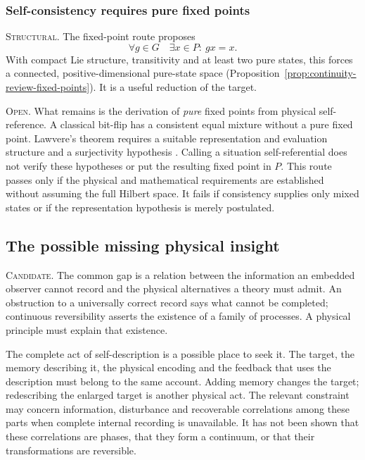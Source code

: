 \subsubsection{Self-consistency requires pure fixed points}
\label{app:continuity-fixed-points}

\noindent\textsc{Structural.}
The fixed-point route proposes
\begin{equation}
  \forall g\in G\quad\exists x\in P:\ gx=x.
  \label{eq:continuity-pure-fixed-point}
\end{equation}
With compact Lie structure, transitivity and at least two pure states,
this forces a connected, positive-dimensional pure-state space
(Proposition~\ref{prop:continuity-review-fixed-points}). It is a useful
reduction of the target.

\noindent\textsc{Open.}
What remains is the derivation of \emph{pure} fixed points from physical
self-reference. A classical bit-flip has a consistent equal mixture without
a pure fixed point. Lawvere's theorem requires a suitable representation
and evaluation structure and a surjectivity hypothesis
\autocite{Lawvere_1969,Yanofsky2003}. Calling a situation self-referential
does not verify these hypotheses or put the resulting fixed point in $P$.
This route passes only if the physical and mathematical requirements are
established without assuming the full Hilbert space. It fails if consistency
supplies only mixed states or if the representation hypothesis is merely
postulated.

\subsection{The possible missing physical insight}
\label{app:continuity-candidate}

\noindent\textsc{Candidate.}
The common gap is a relation between the information an embedded observer
cannot record and the physical alternatives a theory must admit. An
obstruction to a universally correct record says what cannot be completed;
continuous reversibility asserts the existence of a family of processes.
A physical principle must explain that existence.

The complete act of self-description is a possible place to seek it. The
target, the memory describing it, the physical encoding and the feedback
that uses the description must belong to the same account. Adding memory
changes the target; redescribing the enlarged target is another physical
act. The relevant constraint may concern information, disturbance and
recoverable correlations among these parts when complete internal recording
is unavailable. It has not been shown that these correlations are phases,
that they form a continuum, or that their transformations are reversible.


